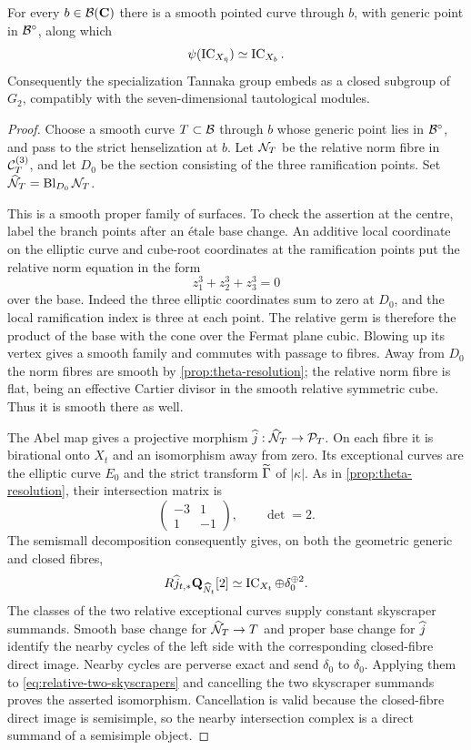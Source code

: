 \begin{proposition}
\label{prop:specialization}
For every $b\in\mathcal B(\mathbf C)$ there is a smooth pointed curve through $b$,
with generic point in $\mathcal B^\circ$, along which
\[
 \psi(\operatorname{IC}_{X_{\bar\eta}})\simeq\operatorname{IC}_{X_b}.
\]
Consequently the specialization Tannaka group embeds as a closed subgroup
of $G_2$, compatibly with the seven-dimensional tautological modules.
\end{proposition}
\begin{proof}
Choose a smooth curve $T\subset\mathcal B$ through $b$ whose generic point lies
in $\mathcal B^\circ$, and pass to the strict henselization at $b$.
Let $\mathcal N_T$ be the relative norm fibre in $\mathcal C_T^{(3)}$, and let
$D_0$ be the section consisting of the three ramification points.
Set $\widehat{\mathcal N}_T=\operatorname{Bl}_{D_0}\mathcal N_T$.

This is a smooth proper family of surfaces.  To check the assertion at
the centre, label the branch points after an \'etale base change.
An additive local coordinate on the elliptic curve and cube-root
coordinates at the ramification points put the relative norm equation
in the form
\[
 z_1^3+z_2^3+z_3^3=0
\]
over the base.  Indeed the three elliptic coordinates sum to zero at
$D_0$, and the local ramification index is three at each point.
The relative germ is therefore the product of the base with the cone
over the Fermat plane cubic.  Blowing up its vertex gives a smooth
family and commutes with passage to fibres.  Away from $D_0$ the norm
fibres are smooth by \cref{prop:theta-resolution}; the relative norm
fibre is flat, being an effective Cartier divisor in the smooth
relative symmetric cube.  Thus it is smooth there as well.

The Abel map gives a projective morphism
$\widehat j:\widehat{\mathcal N}_T\to\mathcal P_T$.  On each fibre it is birational onto $X_t$
and an isomorphism away from zero.  Its exceptional curves are the
elliptic curve $E_0$ and the strict transform $\widetilde\Gamma$ of $|\kappa|$.
As in \cref{prop:theta-resolution}, their intersection matrix is
\[
 \begin{pmatrix}-3&1\\1&-1\end{pmatrix},\qquad\det=2.
\]
The semismall decomposition consequently gives, on both the geometric
generic and closed fibres,
\begin{equation}\label{eq:relative-two-skyscrapers}
 R\widehat j_{t,*}\mathbf Q_{\widehat N_t}[2]
       \simeq\operatorname{IC}_{X_t}\oplus\delta_0^{\oplus2}.
\end{equation}
The classes of the two relative exceptional curves supply constant
skyscraper summands.  Smooth base change for $\widehat{\mathcal N}_T\to T$ and
proper base change for $\widehat j$ identify the nearby cycles of the left
side with the corresponding closed-fibre direct image.
Nearby cycles are perverse exact and send $\delta_0$ to $\delta_0$.
Applying them to \eqref{eq:relative-two-skyscrapers} and cancelling the
two skyscraper summands proves the asserted isomorphism.  Cancellation
is valid because the closed-fibre direct image is semisimple, so the
nearby intersection complex is a direct summand of a semisimple object.


\end{proof}
